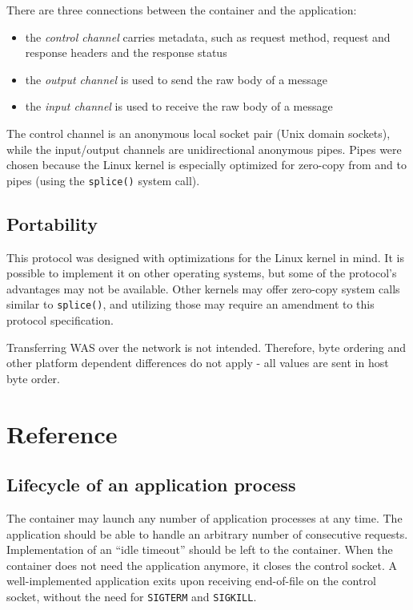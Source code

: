 \documentclass[a4paper,12pt]{article}
\begin{document}
There are three connections between the container and the application:

\begin{itemize}
\item the \emph{control channel} carries metadata, such as request
  method, request and response headers and the response status
\item the \emph{output channel} is used to send the raw body of a
  message
\item the \emph{input channel} is used to receive the raw body of a
  message
\end{itemize}

The control channel is an anonymous local socket pair (Unix domain
sockets), while the input/output channels are unidirectional anonymous
pipes.  Pipes were chosen because the Linux kernel is especially
optimized for zero-copy from and to pipes (using the \texttt{splice()}
system call).

\subsection{Portability}

This protocol was designed with optimizations for the Linux kernel in
mind.  It is possible to implement it on other operating systems, but
some of the protocol's advantages may not be available.  Other kernels
may offer zero-copy system calls similar to \texttt{splice()}, and
utilizing those may require an amendment to this protocol
specification.

Transferring WAS over the network is not intended.  Therefore, byte
ordering and other platform dependent differences do not apply - all
values are sent in host byte order.

\section{Reference}

\subsection{Lifecycle of an application process}

The container may launch any number of application processes at any
time.  The application should be able to handle an arbitrary number of
consecutive requests.  Implementation of an ``idle timeout'' should be
left to the container.  When the container does not need the
application anymore, it closes the control socket.  A well-implemented
application exits upon receiving end-of-file on the control socket,
without the need for \texttt{SIGTERM} and \texttt{SIGKILL}.
\end{document}
